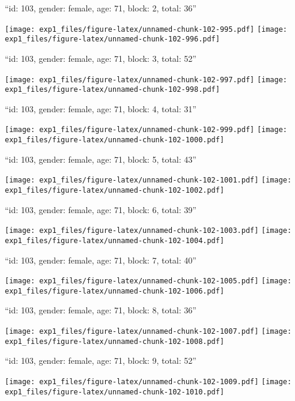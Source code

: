\documentclass[11pt,,]{article}
\begin{document}
\newpage
[1] 

``id: 103, gender: female, age: 71, block: 2, total: 36''

\texttt{[image: exp1\_files/figure-latex/unnamed-chunk-102-995.pdf]}
\texttt{[image: exp1\_files/figure-latex/unnamed-chunk-102-996.pdf]}

\newpage
[1] 

``id: 103, gender: female, age: 71, block: 3, total: 52''

\texttt{[image: exp1\_files/figure-latex/unnamed-chunk-102-997.pdf]}
\texttt{[image: exp1\_files/figure-latex/unnamed-chunk-102-998.pdf]}

\newpage
[1] 

``id: 103, gender: female, age: 71, block: 4, total: 31''

\texttt{[image: exp1\_files/figure-latex/unnamed-chunk-102-999.pdf]}
\texttt{[image: exp1\_files/figure-latex/unnamed-chunk-102-1000.pdf]}

\newpage
[1] 

``id: 103, gender: female, age: 71, block: 5, total: 43''

\texttt{[image: exp1\_files/figure-latex/unnamed-chunk-102-1001.pdf]}
\texttt{[image: exp1\_files/figure-latex/unnamed-chunk-102-1002.pdf]}

\newpage
[1] 

``id: 103, gender: female, age: 71, block: 6, total: 39''

\texttt{[image: exp1\_files/figure-latex/unnamed-chunk-102-1003.pdf]}
\texttt{[image: exp1\_files/figure-latex/unnamed-chunk-102-1004.pdf]}

\newpage
[1] 

``id: 103, gender: female, age: 71, block: 7, total: 40''

\texttt{[image: exp1\_files/figure-latex/unnamed-chunk-102-1005.pdf]}
\texttt{[image: exp1\_files/figure-latex/unnamed-chunk-102-1006.pdf]}

\newpage
[1] 

``id: 103, gender: female, age: 71, block: 8, total: 36''

\texttt{[image: exp1\_files/figure-latex/unnamed-chunk-102-1007.pdf]}
\texttt{[image: exp1\_files/figure-latex/unnamed-chunk-102-1008.pdf]}

\newpage
[1] 

``id: 103, gender: female, age: 71, block: 9, total: 52''

\texttt{[image: exp1\_files/figure-latex/unnamed-chunk-102-1009.pdf]}
\texttt{[image: exp1\_files/figure-latex/unnamed-chunk-102-1010.pdf]}
\end{document}
